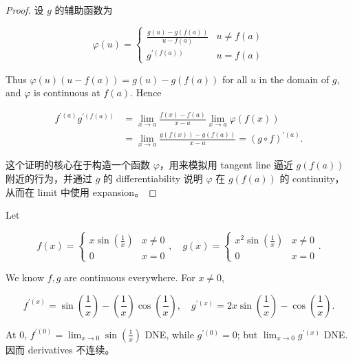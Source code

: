 \begin{proof}

设 \(g\) 的辅助函数为

\[\varphi(u) = \left\{ \begin{matrix}
\frac{g(u) - g\left( {f(a)} \right)}{u - f(a)} & {u \neq f(a)} \\
g^{'{({f{(a)}})}} & {u = f(a)}
\end{matrix} \right.\]

Thus \(\varphi(u)\left( {u - f(a)} \right) = g(u) - g\left( {f(a)} \right)\) for all \(u\) in the domain of \(g\), and \(\varphi\) is continuous at \(f(a)\). Hence

\[\begin{matrix}
{f^{'{(a)}}g^{'{({f{(a)}})}}} & {= \lim\limits_{x\rightarrow a}\frac{f(x) - f(a)}{x - a}\lim\limits_{x\rightarrow a}\varphi\left( {f(x)} \right)} \\
 & {= \lim\limits_{x\rightarrow a}\frac{g\left( {f(x)} \right) - g\left( {f(a)} \right)}{x - a} = \left( {g \circ f} \right)^{'{(a)}}.}
\end{matrix}\]

这个证明的核心在于构造一个函数 \(\varphi\)，用来模拟用 tangent line 逼近 \(g\left( {f(a)} \right)\) 附近的行为，并通过 \(g\) 的 differentiability 说明 \(\varphi\) 在 \(g\left( {f(a)} \right)\) 的 continuity，从而在 limit 中使用 expansion。

\end{proof}

\begin{example}

Let

\[f(x) = \left\{ \begin{matrix}
{x\sin\left( \frac{1}{x} \right)} & {x \neq 0} \\
0 & {x = 0}
\end{matrix} \right.,\quad g(x) = \left\{ \begin{matrix}
{x^{2}\sin\left( \frac{1}{x} \right)} & {x \neq 0} \\
0 & {x = 0}
\end{matrix} \right..\]

We know \(f,g\) are continuous everywhere. For \(x \neq 0\),

\[f^{'{(x)}} = \sin\left( \frac{1}{x} \right) - \left( \frac{1}{x} \right)\cos\left( \frac{1}{x} \right),\quad g^{'{(x)}} = 2x\sin\left( \frac{1}{x} \right) - \cos\left( \frac{1}{x} \right).\]

At \(0\), \(f^{'{(0)}} = \lim_{x\rightarrow 0}\sin\left( \frac{1}{x} \right)\) DNE, while \(g^{'{(0)}} = 0\); but \(\lim_{x\rightarrow 0}g^{'{(x)}}\) DNE. 因而 derivatives 不连续。

\end{example}

